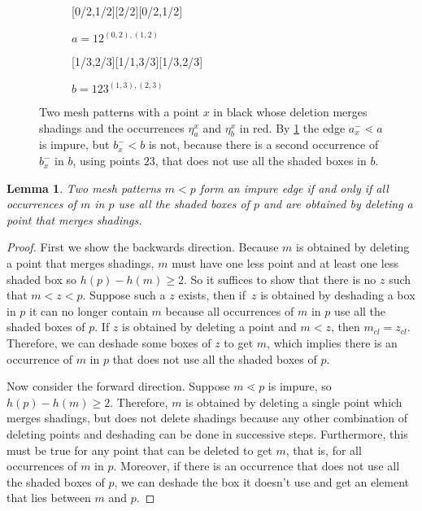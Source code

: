 \documentclass[preprint,11pt]{elsarticle}
\newtheorem{lem}[thm]{Lemma}\crefname{lem}{Lemma}{Lemmas}
\newcommand\cl[1]{#1_{cl}}
\newcommand\occX[2]{\eta^{#2}_{#1}}
\newcommand\mX[2]{#1^{-}_{#2}}
\newcommand\h{h}
\numberwithin{equation}{section}
\numberwithin{figure}{section}
\numberwithin{thm}{section}
\begin{document}
\begin{figure}\centering
\begin{subfigure}[b]{0.3\textwidth}
\centering{}[0/2,1/2][2/2][0/2,1/2]
\caption*{$a=12^{(0,2),(1,2)}$}\label{subfig:a}\end{subfigure}
\begin{subfigure}[b]{0.3\textwidth}
\centering{}[1/3,2/3][1/1,3/3][1/3,2/3]
\caption*{$b=123^{(1,3),(2,3)}$}\label{subfig:b}\end{subfigure}
\caption{Two mesh patterns with a point $x$ in black whose deletion merges shadings and the occurrences
$\occX{a}{x}$ and $\occX{b}{x}$ in red. By \cref{lem:impureEdge} the edge
$\mX{a}{x}\lessdot a$ is impure,
but $\mX{b}{x}<b$ is not, because there is a second occurrence of $\mX{b}{x}$ in $b$, using points $23$,
that does not use all the shaded boxes in $b$.}\label{fig:impEx}
\end{figure}


\begin{lem}\label{lem:impureEdge}
Two mesh patterns $m<p$ form an impure edge if and only if all occurrences of $m$ in
$p$ use all the shaded boxes of $p$ and are obtained by deleting a point that merges
shadings.
\end{lem}

\begin{proof}
First we show the backwards direction. Because $m$ is obtained by deleting a
point that merges shadings, $m$ must have one less point and at least one less
shaded box so $\h(p)-\h(m)\ge2$. So it suffices to show that there is no $z$ such
that $m<z<p$. Suppose such a $z$ exists, then if~$z$ is obtained by deshading a
box in $p$ it can no longer contain $m$ because all occurrences of $m$ in $p$
use all the shaded boxes of $p$. If $z$ is obtained by deleting a point and $m<z$,
then $\cl{m}=\cl{z}$. Therefore, we can deshade some boxes
of $z$ to get $m$, which implies there is an occurrence of $m$ in $p$ that
does not use all the shaded boxes of $p$.

Now consider the forward direction. Suppose $m\lessdot p$ is impure, so
$\h(p)-\h(m)\ge2$. Therefore, $m$ is obtained by deleting a single point
which merges shadings, but does not delete shadings because any other
combination of deleting points and deshading can be done in successive steps.
Furthermore, this must be true for any point that can be deleted to get $m$,
that is, for all occurrences of $m$ in $p$. Moreover, if there is an occurrence
that does not use all the shaded boxes of $p$, we can deshade the box it doesn't
use and get an element that lies between $m$ and $p$.
\end{proof}
\end{document}
